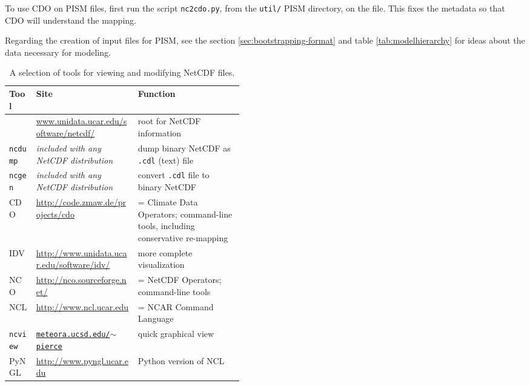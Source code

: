 To use CDO on PISM files, first run the script \texttt{nc2cdo.py}, from the \texttt{util/} PISM directory, on the file.  This fixes the metadata so that CDO will understand the mapping.

Regarding the creation of input files for PISM, see the section \ref{sec:bootstrapping-format} and table \ref{tab:modelhierarchy} for ideas about the data necessary for modeling.

\newcommand{\netcdftool}[1]{#1\index{NetCDF!tools!#1}}
\begin{table}[ht]
\centering
\small
\begin{tabular}{llp{0.45\linewidth}}
  \toprule
  \textbf{Tool} & \textbf{Site} & \textbf{Function} \\
  \midrule
  & \url{www.unidata.ucar.edu/software/netcdf/} & root for NetCDF information \\
  \midrule
  \netcdftool{\texttt{ncdump}} & \emph{included with any NetCDF distribution} & dump binary NetCDF as \texttt{.cdl} (text) file \\
  \netcdftool{\texttt{ncgen}} & \emph{included with any NetCDF distribution} & convert \texttt{.cdl} file to binary NetCDF \\
  \midrule
  \netcdftool{CDO} & \url{http://code.zmaw.de/projects/cdo} & = Climate Data Operators; command-line tools, including conservative re-mapping \\
  \netcdftool{IDV} & \url{http://www.unidata.ucar.edu/software/idv/} & more complete visualization \\
  \netcdftool{NCO}\index{NCO (NetCDF Operators)} & \url{http://nco.sourceforge.net/} & = NetCDF Operators; command-line tools\\
  \netcdftool{NCL} &  \url{http://www.ncl.ucar.edu} & = NCAR Command Language\\
  \netcdftool{\texttt{ncview}} & \href{http://meteora.ucsd.edu/~pierce/ncview_home_page.html}{\texttt{meteora.ucsd.edu/$\sim$pierce}} & quick graphical view \\
  \netcdftool{PyNGL} &  \url{http://www.pyngl.ucar.edu} & Python version of NCL\\
  \bottomrule
\end{tabular}
\normalsize
\caption{A selection of tools for viewing and modifying NetCDF files.}
\label{tab:NetCDFview}
\end{table}




